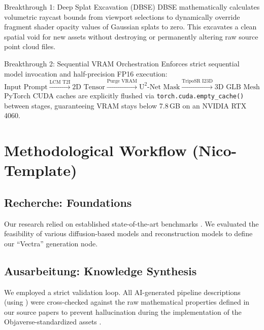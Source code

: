 \documentclass[11pt, a4paper]{article}
\begin{document}
\begin{breakthroughbox}{Breakthrough 1: Deep Splat Excavation (DBSE)}
DBSE mathematically calculates volumetric raycast bounds from viewport selections to dynamically override fragment shader opacity values of Gaussian splats to zero. This excavates a clean spatial void for new assets without destroying or permanently altering raw source point cloud files.
\end{breakthroughbox}

\vspace{8pt}

\begin{breakthroughbox}{Breakthrough 2: Sequential VRAM Orchestration}
Enforces strict sequential model invocation and half-precision FP16 execution:
$$\text{Input Prompt} \xrightarrow{\text{LCM T2I}} \text{2D Tensor} \xrightarrow{\text{Purge VRAM}} \text{U}^2\text{-Net Mask} \xrightarrow{\text{TripoSR I23D}} \text{3D GLB Mesh}$$
PyTorch CUDA caches are explicitly flushed via \texttt{torch.cuda.empty_cache()} between stages, guaranteeing VRAM stays below 7.8\,GB on an NVIDIA RTX 4060.
\end{breakthroughbox}


\section{Methodological Workflow (Nico-Template)}

\subsection{Recherche: Foundations}
Our research relied on established state-of-the-art benchmarks \cite{rabby2024beyondpixels}. We evaluated the feasibility of various diffusion-based models \cite{shi2023mvdream, wang2023imagedream} and reconstruction models \cite{xu2023dmv3d} to define our ``Vectra'' generation node.

\subsection{Ausarbeitung: Knowledge Synthesis}
We employed a strict validation loop. All AI-generated pipeline descriptions (using \cite{tang2024lgm, he2025sparseflex}) were cross-checked against the raw mathematical properties defined in our source papers to prevent hallucination during the implementation of the Objaverse-standardized assets \cite{deitke2023objaverse}.
\end{document}
